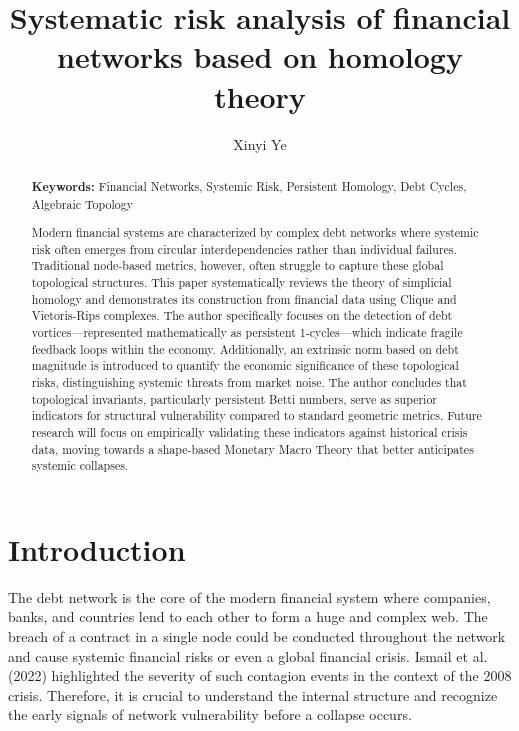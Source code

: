 \documentclass[12pt,reqno]{amsart}
\author{Xinyi Ye}
\title{Systematic risk analysis of financial networks based on homology theory}
\theoremstyle{definition}
\numberwithin{equation}{section}
\begin{document}
	
	
	\begin{abstract}
        \textbf{Keywords:} Financial Networks, Systemic Risk, Persistent Homology, Debt Cycles, Algebraic Topology
        \vspace{0.5cm}
        
		Modern financial systems are characterized by complex debt networks where systemic risk often emerges from circular interdependencies rather than individual failures. Traditional node-based metrics, however, often struggle to capture these global topological structures. This paper systematically reviews the theory of simplicial homology and demonstrates its construction from financial data using Clique and Vietoris-Rips complexes. The author specifically focuses on the detection of debt vortices—represented mathematically as persistent 1-cycles—which indicate fragile feedback loops within the economy. Additionally, an extrinsic norm based on debt magnitude is introduced to quantify the economic significance of these topological risks, distinguishing systemic threats from market noise. The author concludes that topological invariants, particularly persistent Betti numbers, serve as superior indicators for structural vulnerability compared to standard geometric metrics. Future research will focus on empirically validating these indicators against historical crisis data, moving towards a shape-based Monetary Macro Theory that better anticipates systemic collapses.
	\end{abstract}
	
	\maketitle
	
	
	\section{Introduction}\label{intro}

    The debt network is the core of the modern financial system where companies, banks, and countries lend to each other to form a huge and complex web. The breach of a contract in a single node could be conducted throughout the network and cause systemic financial risks or even a global financial crisis. Ismail et al. (2022) \cite{INIR22} highlighted the severity of such contagion events in the context of the 2008 crisis. Therefore, it is crucial to understand the internal structure and recognize the early signals of network vulnerability before a collapse occurs.
\end{document}
